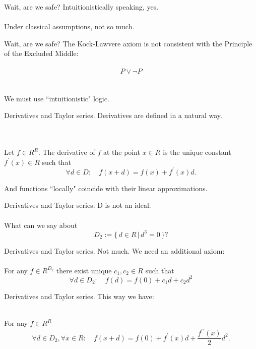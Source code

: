\documentclass[handout, 11pt]{beamer}
\newenvironment{axiom}[1]
{\renewcommand\theinneraxiom{#1}\inneraxiom}
{\endinneraxiom}
\begin{document}
\begin{frame}{Wait, are we safe?}
Intuitionistically speaking, yes. \\~\\
Under classical assumptions, not so much. 
\end{frame}

\begin{frame}{Wait, are we safe?}
The Kock-Lawvere axiom is not consistent with the Principle of the Excluded Middle: \\~\\
\[ P\vee \neg P \]
\\~\\
We must use ``intuitionistic" logic. 
\end{frame}

\begin{frame}{Derivatives and Taylor series.}
	Derivatives are defined in a natural way. \\~\\~\\
	\begin{definition} 
		Let $f\in R^R$. The derivative of $f$ at the point $x\in R$ is the unique 
		constant $f^\prime(x)\in R$ such that
		\[\forall d\in D: \quad f(x+d)= f(x)+ f^\prime(x)d.\]
	\end{definition}
	And functions ``locally" coincide with their linear approximations. 
\end{frame}

\begin{frame}{Derivatives and Taylor series.} 
	D is not an ideal.\\ ~ \\
	What can we say  about
	\[ D_2:= \{ \, d\in R \, | \, d^3=0 \,  \}?\]
\end{frame}

\begin{frame}{Derivatives and Taylor series.} 
	Not much. 
	We need an additional axiom:
	\\~\\
	\begin{axiom}{$1_2$} For any $f\in R^{D_2}$ there exist unique $c_1,c_2\in R$ such that
		\[ \forall d\in D_2: \quad f(d) = f(0) + c_1d + c_2d^2  \]
	\end{axiom}  
\end{frame}

\begin{frame}{Derivatives and Taylor series.} 
	This way we have:
	\\~\\ 
	\begin{theorem} For any $f\in R^R$
		\[ \forall d \in D_2, \forall x\in R : \quad f(x + d)=f(0) + f^\prime(x)d + \frac{f^{\prime \prime}(x)}{2}
		d^2. \]
	\end{theorem}
\end{frame}
\end{document}
